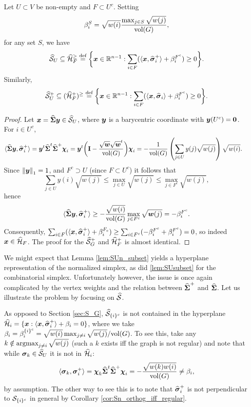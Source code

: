 \begin{lemma}
	\label{lem:SUn_subset}
	Let $U\subset V$ be non-empty and $F\subset U^c$. Setting 
	\[\beta_i^S = \sqrt{w(i)} \frac{\max_{j\in S} \sqrt{w(j)}}{\textnormal{vol}(G)},\]
	for any set $S$, we have 
	\begin{equation*}
	\widehat{\mathcal{S}}_U \subseteq \widehat{\mathcal{H}}_{F}^\geq \overset{\text{def}}{=} \bigg\{\vb*{x}\in\mathbb{R}^{n-1}: \sum_{i\in F} (\langle \vb*{x},\widehat{\vb*{\sigma}}_i^+\rangle + \beta_i^{F^c})\ge 0\bigg\}.
	\end{equation*}
	Similarly, 
	\begin{equation*}
	\widehat{\mathcal{S}}^+_U \subseteq (\widehat{\mathcal{H}}^+_{F})^\geq \overset{\text{def}}{=} \bigg\{\vb*{x}\in\mathbb{R}^{n-1}: \sum_{i\in F} (\langle \vb*{x},\widehat{\vb*{\sigma}}_i\rangle + \beta_i^{F^c})\ge 0\bigg\}.
	\end{equation*}
\end{lemma} 
\begin{proof}
	Let $\vb*{x}=\widehat{\boldsymbol{\Sigma}}\vb*{y}\in \widehat{\mathcal{S}}_U$, where $\vb*{y}$  is a barycentric coordinate with $\vb*{y}(U^c)=\vb{0}$. For $i\in U^c$, 
	\begin{align*}
	\langle \widehat{\boldsymbol{\Sigma}}\vb*{y},\widehat{\vb*{\sigma}}_i^+ \rangle &= \vb*{y}^t \widehat{\boldsymbol{\Sigma}}^t \widehat{\boldsymbol{\Sigma}}^+ \boldsymbol{\chi}_i = \vb*{y}^t \bigg(\vb{I}-\frac{\sqrt{\vb*{w}}\sqrt{\vb*{w}}^t}{\textnormal{vol}(G)}\bigg)\boldsymbol{\chi}_i = - \frac{1}{\textnormal{vol}(G)} \left(\sum_{j\in U}y(j) \sqrt{w(j)}\right) \sqrt{w(i)}.
	\end{align*}
	Since $\norm{\vb*{y}}_1=1$, and $F^c\supset U$ (since $F\subset U^c$) it follows that 
	\[\sum_{j\in U}y(i) \sqrt{w(j)} \leq \max_{j\in U} \sqrt{w(j)} \leq \max_{j\in F^c}\sqrt{w(j)},\]
	hence 
	\[\langle \widehat{\boldsymbol{\Sigma}}\vb*{y},\widehat{\vb*{\sigma}}_i^+\rangle \geq -\frac{\sqrt{w(i)}}{\textnormal{vol}(G)} \max_{j\in F^c}\sqrt{\vb*{w}(j)} = -\beta_i^{F^c}.\]  
	Consequently, $\sum_{i\in F} (\langle \vb*{x},\widehat{\vb*{\sigma}}_i^+\rangle + \beta_i^{F_c}) \geq \sum_{i\in F^c}(-\beta_i^{F^c} +\beta_i^{F^c})=0$, so indeed $\vb*{x}\in \widehat{\mathcal{H}}_F$. The proof for the $\widehat{\mathcal{S}}^+_G$ and $\widehat{\mathcal{H}}_F^+$ is almost identical. 
\end{proof}

We might expect that Lemma \ref{lem:SUn_subset} yields a hyperplane representation of the normalized simplex, as did \ref{lem:SUsubset} for the combinatorial simplex. Unfortunately however, the issue is once again complicated by the vertex weights and the relation between $\widehat{\boldsymbol{\Sigma}}^+$ and $\widehat{\boldsymbol{\Sigma}}$. Let us illustrate the problem by focusing on $\widehat{\mathcal{S}}$. 

As opposed to Section \ref{sec:S_G}, $\widehat{\mathcal{S}}_{\{i\}^c} $ is not contained in the hyperplane $\widehat{\mathcal{H}}_i = \{\vb*{x}: \langle \vb*{x},\widehat{\vb*{\sigma}}_i^+\rangle + \beta_i=0\}$, where we take $\beta_i = \beta_i^{\{i\}^c} = \sqrt{w(i)}\max_{j\neq i}\sqrt{w(j)} / \textnormal{vol}(G)$. To see this, take any $k\notin \operatorname*{\textnormal{argmax}}_{j\neq i} \sqrt{w(j)}$ (such a $k$ exists iff the graph is not regular) and note that while $\vb*{\sigma}_k\in\widehat{\mathcal{S}}_U$ it is not in $\widehat{\mathcal{H}}_i$: 
\[\langle \vb*{\sigma}_k,\vb*{\sigma}_i^+\rangle = \boldsymbol{\chi}_k\widehat{\boldsymbol{\Sigma}}^t\widehat{\boldsymbol{\Sigma}}^+\boldsymbol{\chi}_i = -\frac{\sqrt{w(k)w(i)}}{\textnormal{vol}(G)}\neq \beta_i,\]
by assumption. The other way to see this is to note that $\widehat{\vb*{\sigma}}_i^+$ is not perpendicular to $\mathcal{S}_{\{i\}^c}$ in general by Corollary \ref{cor:Sn_orthog_iff_regular}. 


